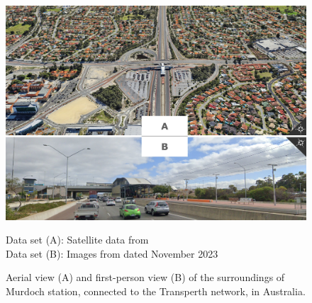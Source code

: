 \begin{refsegment}
\begin{figure}[h!]\vspace*{4pt}
    \caption{Aerial view (A) and first-person view (B) of the surroundings of Murdoch station, connected to the Transperth network, in Australia.}
    \label{fig-chap1:tad-murdoch}
    \centerline{\includegraphics[width=1\columnwidth]{src/Figures/Chap-1/Murdoch.jpg}}
    \vspace{5pt}
    \begin{flushright}\scriptsize{
    Data set (A): Satellite data from \textcolor{blue}{\textcite{google_earth_google_2023}}
    \\
    Data set (B): Images from  dated November 2023
    }\end{flushright}
\end{figure}


\end{refsegment}
